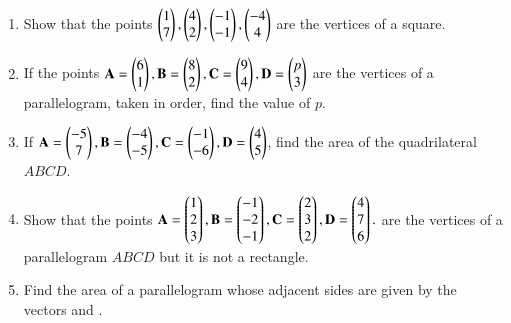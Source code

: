 \renewcommand{\theequation}{\theenumi}
\begin{enumerate}[label=\arabic*.,ref=\thesubsection.\theenumi]
\item Show that the points $\begin{pmatrix}1\\7\end{pmatrix}, \begin{pmatrix}4\\2\end{pmatrix}, \begin{pmatrix}-1\\-1\end{pmatrix}, \begin{pmatrix}-4\\4\end{pmatrix} $  are the vertices of a square.
\item If the points
$
\mathbf{A} = \begin{pmatrix}6\\1\end{pmatrix}, 
\mathbf{B} = \begin{pmatrix}8\\2\end{pmatrix}, 
\mathbf{C} = \begin{pmatrix}9\\4\end{pmatrix}, 
\mathbf{D} = \begin{pmatrix}p\\3\end{pmatrix}
$
are the vertices of a parallelogram, taken in order, find the value of $p$.
\item If $\mathbf{A} = \begin{pmatrix}-5\\7\end{pmatrix}, \mathbf{B} = \begin{pmatrix}-4\\-5\end{pmatrix}, \mathbf{C} = \begin{pmatrix}-1\\-6\end{pmatrix}, \mathbf{D} = \begin{pmatrix}4\\5\end{pmatrix}$, find the area of the quadrilateral $ABCD$.
%
\item Show that the points 
$\mathbf{A} = \begin{pmatrix}1\\2\\3\end{pmatrix},
 \mathbf{B} = \begin{pmatrix}-1\\-2\\-1\end{pmatrix},
\mathbf{C} = \begin{pmatrix}2\\3\\2\end{pmatrix},
\mathbf{D} = \begin{pmatrix}4\\7\\6\end{pmatrix}.
$
are the vertices of a parallelogram $ABCD$ but it is not a rectangle.
%
\item Find the area of a parallelogram whose adjacent sides are given by the vectors  and .
%
\end{enumerate}
%
